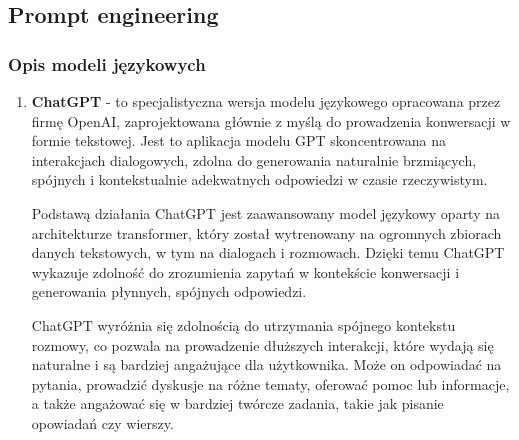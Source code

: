 \subsection{Prompt engineering}

\subsubsection{Opis modeli językowych}

\begin{enumerate}
\item {\bf ChatGPT} - to specjalistyczna wersja modelu językowego opracowana przez firmę OpenAI, zaprojektowana głównie z myślą do prowadzenia konwersacji w formie tekstowej. Jest to aplikacja modelu GPT skoncentrowana na interakcjach dialogowych, zdolna do generowania naturalnie brzmiących, spójnych i kontekstualnie adekwatnych odpowiedzi w czasie rzeczywistym.

Podstawą działania ChatGPT jest zaawansowany model językowy oparty na architekturze transformer, który został wytrenowany na ogromnych zbiorach danych tekstowych, w tym na dialogach i rozmowach. Dzięki temu ChatGPT wykazuje zdolność do zrozumienia zapytań w kontekście konwersacji i generowania płynnych, spójnych odpowiedzi.
    
ChatGPT wyróżnia się zdolnością do utrzymania spójnego kontekstu rozmowy, co pozwala na prowadzenie dłuższych interakcji, które wydają się naturalne i są bardziej angażujące dla użytkownika. Może on odpowiadać na pytania, prowadzić dyskusje na różne tematy, oferować pomoc lub informacje, a także angażować się w bardziej twórcze zadania, takie jak pisanie opowiadań czy wierszy.
    

\end{enumerate}
